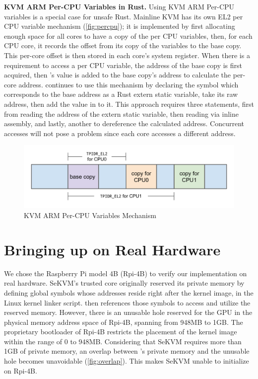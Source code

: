 \textbf{KVM ARM Per-CPU Variables in Rust.}
Using KVM ARM Per-CPU variables is a special case for unsafe Rust.
Mainline KVM has its own EL2 per CPU variable mechanism (\autoref{fig:percpu});
it is implemented by first
allocating enough space for all cores to have a copy of the per CPU variables,
then, for each CPU core, it records the offset from its copy of the variables to the
base copy. This per-core offset is then stored in each core's 
system register. When there is a requirement to access a per CPU variable, the
address of the base copy is first acquired, then 's value is
added to the base copy's address to calculate the per-core address.
\rustsec{} continues to use
this mechanism by declaring the symbol which corresponds to the base address as
a Rust extern static variable, take its raw address, then add the value in
 to it. This approach requires three  statements,
first from reading the address of the extern static variable, then reading
 via inline assembly, and lastly, another  to
dereference the calculated address. Concurrent accesses will not pose a problem
since each core accesses a different address.

\begin{figure}[hbtp]
    \includegraphics[scale=0.60]{figures/percpu.pdf}
    \caption{KVM ARM Per-CPU Variables Mechanism}
    \label{fig:percpu}
\end{figure}

\section{Bringing up \rustsec{} on Real Hardware}

We chose the Raspberry Pi model 4B (Rpi-4B) to verify our implementation on
real hardware.
SeKVM's trusted core \secore{} originally reserved its private memory by
defining global symbols whose addresses reside right after the kernel image,
in the Linux kernel linker script.
\secore{} then references those symbols to access and utilize the reserved
memory.
However, there is an unusable hole reserved for the GPU in the physical memory
address space of Rpi-4B, spanning from 948MB to 1GB. The proprietary bootloader
of Rpi-4B restricts the placement of the kernel image within the range of 0 to
948MB. Considering that SeKVM requires more than 1GB of private memory, an
overlap between \secore{}'s private memory and the unusable hole becomes
unavoidable (\autoref{fig:overlap}). This makes SeKVM unable to initialize on
Rpi-4B.

